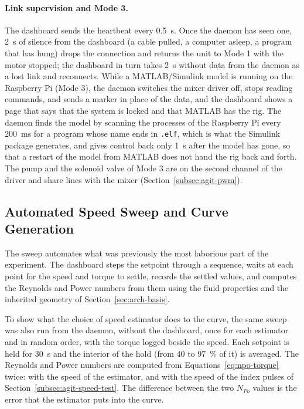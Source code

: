 \paragraph{Link supervision and Mode 3.}
The dashboard sends the heartbeat every 0.5~s. Once the daemon has seen one, 2~s of silence from the dashboard (a cable pulled, a computer asleep, a program that has hung) drops the connection and returns the unit to Mode 1 with the motor stopped; the dashboard in turn takes 2~s without data from the daemon as a lost link and reconnects. While a MATLAB/Simulink model is running on the Raspberry Pi (Mode 3), the daemon switches the mixer driver off, stops reading commands, and sends a marker in place of the data, and the dashboard shows a page that says that the system is locked and that MATLAB has the rig. The daemon finds the model by scanning the processes of the Raspberry Pi every 200~ms for a program whose name ends in \texttt{.elf}, which is what the Simulink package generates, and gives control back only 1~s after the model has gone, so that a restart of the model from MATLAB does not hand the rig back and forth. The pump and the solenoid valve of Mode 3 are on the second channel of the driver and share lines with the mixer (Section~\ref{subsec:agit-pwm}).

\subsection{Automated Speed Sweep and Curve Generation}
\label{subsec:agit-sweep}

The sweep automates what was previously the most laborious part of the experiment. The dashboard steps the setpoint through a sequence, waits at each point for the speed and torque to settle, records the settled values, and computes the Reynolds and Power numbers from them using the fluid properties and the inherited geometry of Section~\ref{sec:arch-basis}.

To show what the choice of speed estimator does to the curve, the same sweep was also run from the daemon, without the dashboard, once for each estimator and in random order, with the torque logged beside the speed. Each setpoint is held for 30~s and the interior of the hold (from 40 to 97~\% of it) is averaged. The Reynolds and Power numbers are computed from Equations~\ref{eq:npo-torque} twice: with the speed of the estimator, and with the speed of the index pulses of Section~\ref{subsec:agit-speed-test}. The difference between the two $N_{Po}$ values is the error that the estimator puts into the curve.

